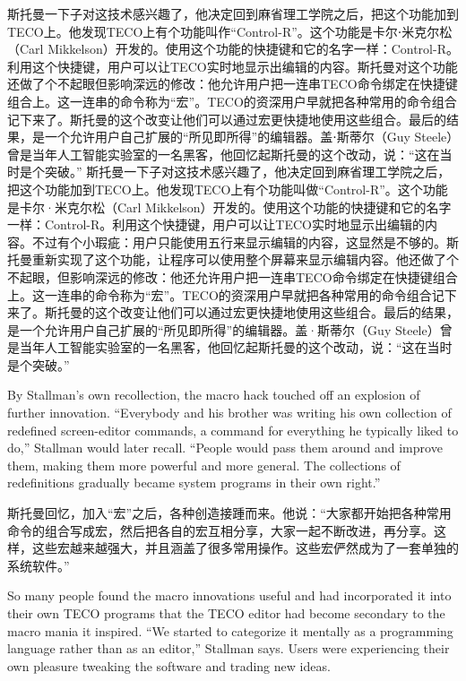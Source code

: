 \ifdefined\chs
\ifdefined\vone
斯托曼一下子对这技术感兴趣了，他决定回到麻省理工学院之后，把这个功能加到TECO上。他发现TECO上有个功能叫作``Control-R''。这个功能是卡尔⋅米克尔松（Carl Mikkelson）开发的。使用这个功能的快捷键和它的名字一样：Control-R。利用这个快捷键，用户可以让TECO实时地显示出编辑的内容。斯托曼对这个功能还做了个不起眼但影响深远的修改：他允许用户把一连串TECO命令绑定在快捷键组合上。这一连串的命令称为``宏''。TECO的资深用户早就把各种常用的命令组合记下来了。斯托曼的这个改变让他们可以通过宏更快捷地使用这些组合。最后的结果，是一个允许用户自己扩展的``所见即所得''的编辑器。盖⋅斯蒂尔（Guy Steele）曾是当年人工智能实验室的一名黑客，他回忆起斯托曼的这个改动，说：``这在当时是个突破。''
\fi
\ifdefined\vtwo
斯托曼一下子对这技术感兴趣了，他决定回到麻省理工学院之后，把这个功能加到TECO上。他发现TECO上有个功能叫做``Control-R''。这个功能是卡尔·米克尔松（Carl Mikkelson）开发的。使用这个功能的快捷键和它的名字一样：Control-R。利用这个快捷键，用户可以让TECO实时地显示出编辑的内容。不过有个小瑕疵：用户只能使用五行来显示编辑的内容，这显然是不够的。斯托曼重新实现了这个功能，让程序可以使用整个屏幕来显示编辑内容。他还做了个不起眼，但影响深远的修改：他还允许用户把一连串TECO命令绑定在快捷键组合上。这一连串的命令称为``宏''。TECO的资深用户早就把各种常用的命令组合记下来了。斯托曼的这个改变让他们可以通过宏更快捷地使用这些组合。最后的结果，是一个允许用户自己扩展的``所见即所得''的编辑器。盖·斯蒂尔（Guy Steele）曾是当年人工智能实验室的一名黑客，他回忆起斯托曼的这个改动，说：``这在当时是个突破。''
\fi
\fi

\ifdefined\eng
By Stallman's own recollection, the macro hack touched off an explosion of further innovation. ``Everybody and his brother was writing his own collection of redefined screen-editor commands, a command for everything he typically liked to do,'' Stallman would later recall. ``People would pass them around and improve them, making them more powerful and more general. The collections of redefinitions gradually became system programs in their own right.''
\fi

\ifdefined\chs
斯托曼回忆，加入``宏''之后，各种创造接踵而来。他说：``大家都开始把各种常用命令的组合写成宏，然后把各自的宏互相分享，大家一起不断改进，再分享。这样，这些宏越来越强大，并且涵盖了很多常用操作。这些宏俨然成为了一套单独的系统软件。''
\fi

\ifdefined\eng
So many people found the macro innovations useful and had incorporated it into their own TECO programs that the TECO editor had become secondary to the macro mania it inspired. ``We started to categorize it mentally as a programming language rather than as an editor,'' Stallman says. Users were experiencing their own pleasure tweaking the software and trading new ideas.
\fi

